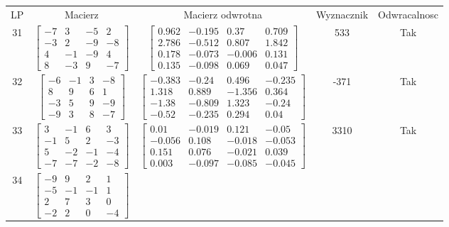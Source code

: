 \documentclass[a4paper,12pt]{article}
\begin{document}
\bgroup {} \vspace{0.2in} \begin{tabular}{c c c c c}
LP & Macierz & Macierz odwrotna & Wyznacznik & Odwracalnosc\\
31
&
$\begin{bmatrix} -7 & 3 & -5 & 2 \\ -3 & 2 & -9 & -8 \\ 4 & -1 & -9 & 4 \\ 8 & -3 & 9 & -7 \end{bmatrix}$
&
$\begin{bmatrix} 0.962 & -0.195 & 0.37 & 0.709 \\ 2.786 & -0.512 & 0.807 & 1.842 \\ 0.178 & -0.073 & -0.006 & 0.131 \\ 0.135 & -0.098 & 0.069 & 0.047 \end{bmatrix}$
&
533
&
Tak
\\
32
&
$\begin{bmatrix} -6 & -1 & 3 & -8 \\ 8 & 9 & 6 & 1 \\ -3 & 5 & 9 & -9 \\ -9 & 3 & 8 & -7 \end{bmatrix}$
&
$\begin{bmatrix} -0.383 & -0.24 & 0.496 & -0.235 \\ 1.318 & 0.889 & -1.356 & 0.364 \\ -1.38 & -0.809 & 1.323 & -0.24 \\ -0.52 & -0.235 & 0.294 & 0.04 \end{bmatrix}$
&
-371
&
Tak
\\
33
&
$\begin{bmatrix} 3 & -1 & 6 & 3 \\ -1 & 5 & 2 & -3 \\ 5 & -2 & -1 & -4 \\ -7 & -7 & -2 & -8 \end{bmatrix}$
&
$\begin{bmatrix} 0.01 & -0.019 & 0.121 & -0.05 \\ -0.056 & 0.108 & -0.018 & -0.053 \\ 0.151 & 0.076 & -0.021 & 0.039 \\ 0.003 & -0.097 & -0.085 & -0.045 \end{bmatrix}$
&
3310
&
Tak
\\
34
&
$\begin{bmatrix} -9 & 9 & 2 & 1 \\ -5 & -1 & -1 & 1 \\ 2 & 7 & 3 & 0 \\ -2 & 2 & 0 & -4 \end{bmatrix}$

\end{tabular}
\end{document}
